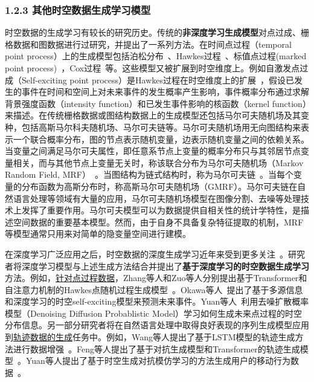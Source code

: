 \subsubsection{1.2.3 其他时空数据生成学习模型}
时空数据的生成学习有较长的研究历史。传统的\textbf{非深度学习生成模型}对点过成、栅格数据和图数据进行过研究，并提出了一系列方法。在时间点过程（temporal point process）上的生成模型包括泊松分布~\cite{pasupathy2010generating}、Hawkes过程~\cite{gonzalez2016spatio}、标值点过程(marked point process)~\cite{cressie2015statistics}，Cox过程~\cite{brix2001spatiotemporal}等。这些模型又被扩展到时空维度上。例如自激发点过成（Self-exciting point process）是Hawkes过程在时空维度上的扩展~\cite{mohler2011self}，假设已发生的事件在时间和空间上对未来事件的发生概率产生影响，事件概率分布通过求解背景强度函数（intensity function）和已发生事件影响的核函数（kernel function）来描述。在传统栅格数据或图结构数据上的生成模型还包括马尔可夫随机场及其变种，包括高斯马尔科夫随机场、马尔可夫链等。马尔可夫随机场用无向图结构来表示一个联合概率分布，图的节点表示随机变量，边表示随机变量之间的依赖关系。当变量之间满足马尔可夫属性，即任意系节点上变量的概率分布只与其邻居节点变量相关，而与其他节点上变量无关时，称该联合分布为马尔可夫随机场（Markov Random Field, MRF）~\cite{li1994markov}。当图结构为链式结构时，称为马尔可夫链~\cite{ching2006markov}。当每个变量的分布函数为高斯分布时，称高斯马尔可夫随机场（GMRF）。马尔可夫链在自然语言处理等领域有大量的应用，马尔可夫随机场模型在图像分割、去噪等处理技术上发挥了重要作用。马尔可夫模型可以为数据提供自相关性的统计学特性，是描述空间数据的重要基本模型。然而，由于自身不具备复杂特征提取的机制，MRF等模型通常只用来对简单的隐变量空间进行建模。

在深度学习广泛应用之后，时空数据的深度生成学习近年来受到更多关注~\cite{gao2022generative}。研究者将深度学习模型与上述生成方法结合并提出了\textbf{基于深度学习的时空数据生成学习}方法。例如，\underline{针对点过程数据}，Zhang等人和Zuo等人分别提出基于Transformer和自注意力机制的Hawkes点随机过程生成模型~\cite{zuo2020transformer,zhang2020self}。Okawa等人~\cite{okawa2019deep}提出了基于多源信息和深度学习的时空self-exciting模型来预测未来事件。Yuan等人~\cite{yuan2023spatio}利用去噪扩散概率模型（Denoising Diffusion Probablistic Model）学习如何生成未来点过程的时空分布信息。另一部分研究者将在自然语言处理中取得良好表现的序列生成模型应用到\underline{轨迹数据的生成}任务中。例如，Wang等人提出了基于LSTM模型的轨迹生成方法进行数据增强~\cite{wang2022deep}。Feng等人提出了基于对抗生成模型和Transformer的轨迹生成模型~\cite{feng2020learning}。Yuan等人提出了基于时空生成对抗模仿学习的方法生成用户的移动行为数据~\cite{yuan2022activity}。


